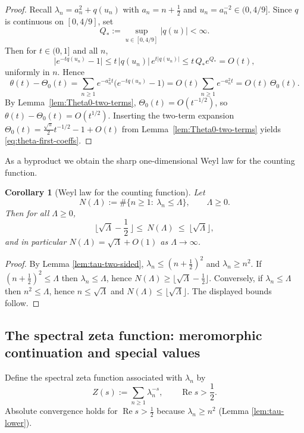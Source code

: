 \documentclass[11pt,letterpaper]{amsart}
\numberwithin{equation}{section}
\newtheorem{corollary}[theorem]{Corollary}
\theoremstyle{definition}
\newcommand{\Ree}{\operatorname{Re}}
\begin{document}
\begin{proof}
Recall $\lambda_n=a_n^2+q(u_n)$ with $a_n=n+\tfrac12$ and $u_n=a_n^{-2}\in(0,4/9]$.
Since $q$ is continuous on $[0,4/9]$, set
\[
Q_*:=\sup_{u\in[0,4/9]}|q(u)|<\infty.
\]
Then for $t\in(0,1]$ and all $n$,
\[
\bigl|e^{-tq(u_n)}-1\bigr|
\le t\,|q(u_n)|\,e^{t|q(u_n)|}
\le t\,Q_* e^{Q_*}
=O(t),
\]
uniformly in $n$. Hence
\[
\theta(t)-\Theta_0(t)
=\sum_{n\ge1}e^{-a_n^2t}\bigl(e^{-tq(u_n)}-1\bigr)
=O(t)\sum_{n\ge1}e^{-a_n^2t}
=O(t)\,\Theta_0(t).
\]
By Lemma~\ref{lem:Theta0-two-terms}, $\Theta_0(t)=O(t^{-1/2})$, so
$\theta(t)-\Theta_0(t)=O(t^{1/2})$. Inserting the two-term expansion
$\Theta_0(t)=\frac{\sqrt{\pi}}{2}t^{-1/2}-1+O(t)$ from Lemma~\ref{lem:Theta0-two-terms}
yields \eqref{eq:theta-first-coeffs}.
\end{proof}


As a byproduct we obtain the sharp one-dimensional Weyl law for the counting function.

\begin{corollary}[Weyl law for the counting function]\label{cor:weyl}
Let
\[
N(\Lambda):=\#\{n\ge 1:\ \lambda_n\le \Lambda\},\qquad \Lambda\ge 0.
\]
Then for all $\Lambda\ge 0$,
\[
\lfloor\sqrt{\Lambda}-\frac12\ \rfloor\le\ N(\Lambda)\ \le\ \lfloor\sqrt{\Lambda}\rfloor,
\]
and in particular $N(\Lambda)=\sqrt{\Lambda}+O(1)$ as $\Lambda\to\infty$.
\end{corollary}

\begin{proof}
By Lemma \ref{lem:tau-two-sided}, $\lambda_n\le (n+\tfrac12)^2$ and $\lambda_n\ge n^2$.
If $(n+\tfrac12)^2\le \Lambda$ then $\lambda_n\le \Lambda$, hence $N(\Lambda)\ge \lfloor \sqrt{\Lambda}-\tfrac12\rfloor$.
Conversely, if $\lambda_n\le \Lambda$ then $n^2\le \Lambda$, hence $n\le \sqrt{\Lambda}$ and $N(\Lambda)\le \lfloor \sqrt{\Lambda}\rfloor$.
The displayed bounds follow.
\end{proof}

\subsection{The spectral zeta function: meromorphic continuation and special values}

Define the spectral zeta function associated with $\lambda_n$ by
\begin{equation}\label{eq:def-Z}
Z(s):=\sum_{n\ge 1}\lambda_n^{-s},\qquad \Ree s>\frac12.
\end{equation}
Absolute convergence holds for $\Ree s>\tfrac12$ because $\lambda_n\ge n^2$ (Lemma \ref{lem:tau-lower}).
\end{document}
